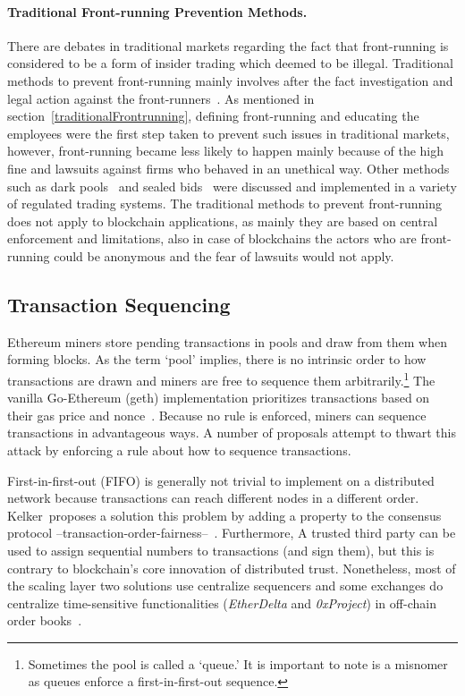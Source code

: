 \paragraph{Traditional Front-running Prevention Methods.} There are debates in traditional markets regarding the fact that front-running is considered to be a form of insider trading which deemed to be illegal. Traditional methods to prevent front-running mainly involves after the fact investigation and legal action against the front-runners~\cite{FTFrontrunning18}. As mentioned in section~\ref{traditionalFrontrunning}, defining front-running and educating the employees were the first step taken to prevent such issues in traditional markets, however, front-running became less likely to happen mainly because of the high fine and lawsuits against firms who behaved in an unethical way. Other methods such as dark pools~\cite{zhu2014dark,buti2011diving} and sealed bids~\cite{radner1989sealed} were discussed and implemented in a variety of regulated trading systems. The traditional methods to prevent front-running does not apply to blockchain applications, as mainly they are based on central enforcement and limitations, also in case of blockchains the actors who are front-running could be anonymous and the fear of lawsuits would not apply. 

\subsection{Transaction Sequencing}

Ethereum miners store pending transactions in pools and draw from them when forming blocks. As the term `pool' implies, there is no intrinsic order to how transactions are drawn and miners are free to sequence them arbitrarily.\footnote{Sometimes the pool is called a `queue.' It is important to note is a misnomer as queues enforce a first-in-first-out sequence.} The vanilla Go-Ethereum (geth) implementation prioritizes transactions based on their gas price and nonce~\cite{EthMinerTxOrder}. Because no rule is enforced, miners can sequence transactions in advantageous ways. A number of proposals attempt to thwart this attack by enforcing a rule about how to sequence transactions.

First-in-first-out (FIFO) is generally not trivial to implement on a distributed network because transactions can reach different nodes in a different order. Kelker~\etal proposes a solution this problem by adding a property to the consensus protocol --transaction-order-fairness--~\cite{kelkar2020order,cryptoeprint:2021/1465}. Furthermore, A trusted third party can be used to assign sequential numbers to transactions (and sign them), but this is contrary to blockchain's core innovation of distributed trust. Nonetheless, most of the scaling layer two solutions use centralize sequencers and some exchanges do centralize time-sensitive functionalities (\eg  \textit{EtherDelta} and \textit{0xProject}) in off-chain order books~\cite{warren20170x,0xfrontrunning:online}.

